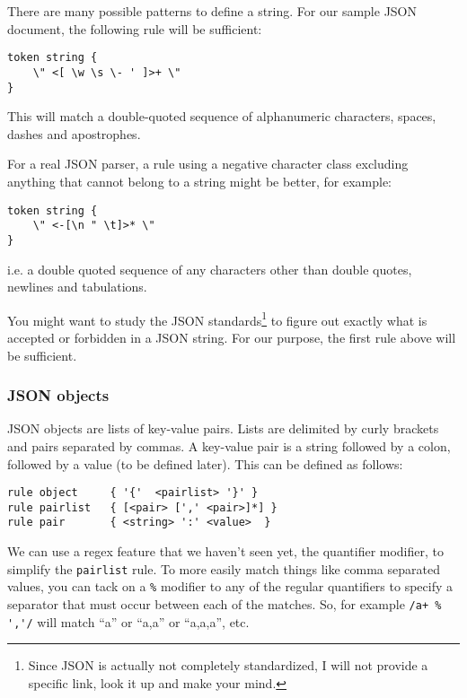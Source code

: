 There are many possible patterns to define a string. For 
our sample JSON document, the following rule will be 
sufficient:

\begin{verbatim}
token string {
    \" <[ \w \s \- ' ]>+ \" 
}
\end{verbatim}

This will match a double-quoted sequence of alphanumeric 
characters, spaces, dashes and apostrophes.

For a real JSON parser, a rule using a negative character 
class excluding anything that cannot belong to a string 
might be better, for example:

\begin{verbatim}
token string {
    \" <-[\n " \t]>* \"
}
\end{verbatim}

i.e. a double quoted sequence of any characters other than 
double quotes, newlines and tabulations.

You might want to study the JSON standards\footnote{Since 
JSON is actually not completely standardized, I will not provide 
a specific link, look it up and make your mind.} to figure out 
exactly what is accepted or forbidden in a JSON string. 
For our purpose, the first rule above will be sufficient.

\subsubsection{JSON objects}

JSON objects are lists of key-value pairs. Lists are 
delimited by curly brackets and pairs separated by 
commas. A key-value pair is a string followed by a colon, 
followed by a value (to be defined later). This can be 
defined as follows:

\begin{verbatim}
rule object     { '{'  <pairlist> '}' }
rule pairlist   { [<pair> [',' <pair>]*] }
rule pair       { <string> ':' <value>  }
\end{verbatim}

We can use a regex feature that we haven't seen yet, the 
quantifier modifier, to simplify the {\tt pairlist} 
rule. To more easily match things like comma separated 
values, you can tack on a \verb'%' modifier to any of 
the regular quantifiers to specify a separator that must 
occur between each of the matches. So, for example 
\verb"/a+ % ','/" will match ``a'' or ``a,a'' or 
``a,a,a'', etc.

